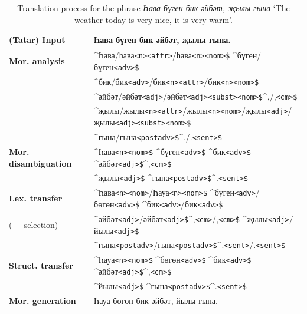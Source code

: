 \documentclass[11pt,a4paper]{article}
\newcommand{\tag}[1]{{\small{\texttt{#1}}}}
\begin{document}
\begin{table}
\centering
\begin{tabular}{ll}
\hline
{\bf (Tatar) Input} & Һава бүген бик әйбәт, җылы гына. \\ 
\hline
{\bf Mor. analysis} & \^{}Һава/һава\tag{<n>}\tag{<attr>}/һава\tag{<n>}\tag{<nom>\$} \^{}бүген/бүген\tag{<adv>\$}  \\
 ~             & \^{}бик/бик\tag{<adv>}/бик\tag{<n>}\tag{<attr>}/бик\tag{<n>}\tag{<nom>\$} \\ 
 ~             & \^{}әйбәт/әйбәт\tag{<adj>}/әйбәт\tag{<adj>}\tag{<subst>}\tag{<nom>\$}\^{},/,\tag{<cm>\$} \\ 
 ~             & \^{}җылы/җылы\tag{<n>}\tag{<attr>}/җылы\tag{<n>}\tag{<nom>}/җылы\tag{<adj>}/җылы\tag{<adj>}\tag{<subst>}\tag{<nom>\$} \\
 ~             & \^{}гына/гына\tag{<postadv>\$}\^{}./.\tag{<sent>\$} \\
\hline
{\bf Mor. disambiguation}& \^{}Һава\tag{<n>}\tag{<nom>\$} \^{}бүген\tag{<adv>\$} \^{}бик\tag{<adv>\$} \^{}әйбәт\tag{<adj>\$}\^{},\tag{<cm>\$} \\ 
 ~                  & \^{}җылы\tag{<adj>\$} \^{}гына\tag{<postadv>\$}\^{}.\tag{<sent>\$}\\
\hline
{\bf Lex. transfer} & \^{}Һава\tag{<n>}\tag{<nom>}/Һауа\tag{<n>}\tag{<nom>\$} \^{}бүген\tag{<adv>}/бөгөн\tag{<adv>\$} \^{}бик\tag{<adv>}/бик\tag{<adv>\$} \\
( + selection)                     & \^{}әйбәт\tag{<adj>}/әйбәт\tag{<adj>\$}\^{},\tag{<cm>}/,\tag{<cm>\$} \^{}җылы\tag{<adj>}/йылы\tag{<adj>\$} \\ 
~                     & \^{}гына\tag{<postadv>}/ғына\tag{<postadv>\$}\^{}.\tag{<sent>}/.\tag{<sent>\$}\\
\hline
{\bf Struct. transfer}& \^{}Һауа\tag{<n>}\tag{<nom>\$} \^{}бөгөн\tag{<adv>\$} \^{}бик\tag{<adv>\$} \^{}әйбәт\tag{<adj>\$}\^{},\tag{<cm>\$} \\ 
~                    & \^{}йылы\tag{<adj>\$} \^{}ғына\tag{<postadv>\$}\^{}.\tag{<sent>\$}\\
\hline
{\bf Mor. generation} & Һауа бөгөн бик әйбәт, йылы ғына. \\
\hline
\end{tabular}
 \caption{Translation process for the phrase \emph{Һава бүген бик әйбәт, җылы гына} `The weather today is very nice, it is very warm'.}
\end{table}
\end{document}
